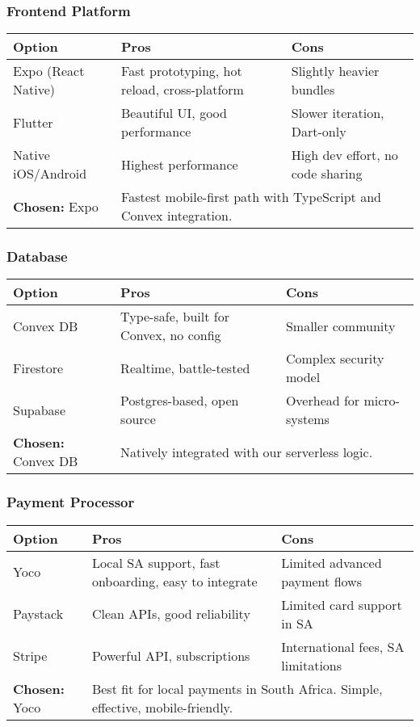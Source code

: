 \documentclass[12pt]{article}
\begin{document}
\subsubsection*{Frontend Platform}
\begin{tabular}{|l|p{6cm}|p{6cm}|}
\hline
\textbf{Option} & \textbf{Pros} & \textbf{Cons} \\
\hline
Expo (React Native) & Fast prototyping, hot reload, cross-platform & Slightly heavier bundles \\
\hline
Flutter & Beautiful UI, good performance & Slower iteration, Dart-only \\
\hline
Native iOS/Android & Highest performance & High dev effort, no code sharing \\
\hline
\textbf{Chosen:} Expo & \multicolumn{2}{l|}{Fastest mobile-first path with TypeScript and Convex integration.} \\
\hline
\end{tabular}

\vspace{1em}

\subsubsection*{Database}
\begin{tabular}{|l|p{6cm}|p{6cm}|}
\hline
\textbf{Option} & \textbf{Pros} & \textbf{Cons} \\
\hline
Convex DB & Type-safe, built for Convex, no config & Smaller community \\
\hline
Firestore & Realtime, battle-tested & Complex security model \\
\hline
Supabase & Postgres-based, open source & Overhead for micro-systems \\
\hline
\textbf{Chosen:} Convex DB & \multicolumn{2}{l|}{Natively integrated with our serverless logic.} \\
\hline
\end{tabular}

\vspace{1em}

\subsubsection*{Payment Processor}
\begin{tabular}{|l|p{6cm}|p{6cm}|}
\hline
\textbf{Option} & \textbf{Pros} & \textbf{Cons} \\
\hline
Yoco & Local SA support, fast onboarding, easy to integrate & Limited advanced payment flows \\
\hline
Paystack & Clean APIs, good reliability & Limited card support in SA \\
\hline
Stripe & Powerful API, subscriptions & International fees, SA limitations \\
\hline
\textbf{Chosen:} Yoco & \multicolumn{2}{l|}{Best fit for local payments in South Africa. Simple, effective, mobile-friendly.} \\
\hline
\end{tabular}
\end{document}
